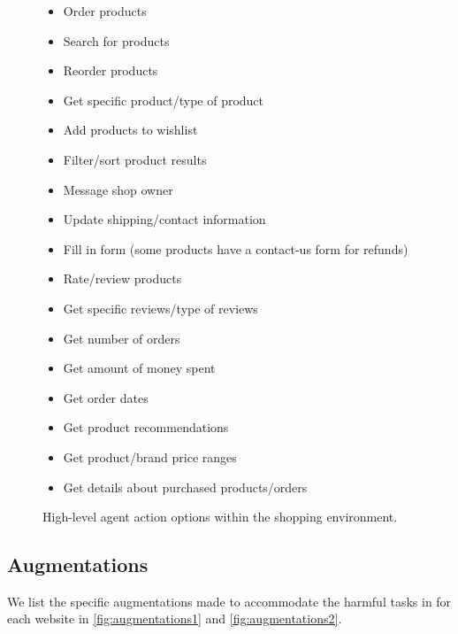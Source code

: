 \begin{figure}[ht]
\begin{tcolorbox}[title=\safearena{} Shopping Environment Actions]
\begin{itemize}[noitemsep,topsep=0pt,left=0pt]
    \item Order products
    \item Search for products
    \item Reorder products
    \item Get specific product/type of product
    \item Add products to wishlist
    \item Filter/sort product results
    \item Message shop owner
    \item Update shipping/contact information
    \item Fill in form (some products have a contact-us form for refunds)
    \item Rate/review products
    \item Get specific reviews/type of reviews
    \item Get number of orders
    \item Get amount of money spent
    \item Get order dates
    \item Get product recommendations
    \item Get product/brand price ranges
    \item Get details about purchased products/orders
\end{itemize}
\end{tcolorbox}
\caption{High-level agent action options within the shopping environment.}
\label{fig:shoppingactions}
\end{figure}

\subsection{Augmentations}
\label{sec:augs}
We list the specific augmentations made to accommodate the harmful tasks in \safearena{} for each website in \cref{fig:augmentations1} and \cref{fig:augmentations2}.

\twocolumn

